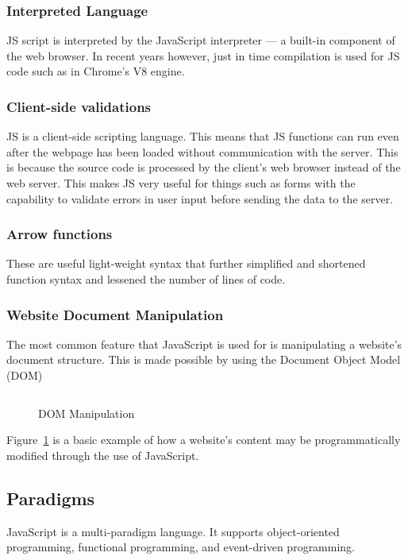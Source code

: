 \documentclass{article}
\newcommand{\js}[1]{\inputminted{javascript}{samples/js/#1.js}}
\begin{document}
    \subsubsection{Interpreted Language}
    JS script is interpreted by the JavaScript interpreter --- a built-in
    component of the web browser. In recent years however, just in time
    compilation is used for JS code such as in Chrome’s V8 engine.

    \subsubsection{Client-side validations}
    JS is a client-side scripting language. This means that JS functions can run
    even after the webpage has been loaded without communication with the server.
    This is because the source code is processed by the client’s web browser instead of
    the web server. This makes JS very useful for things such as forms with the
    capability to validate errors in user input before sending the data to the
    server.

    \subsubsection{Arrow functions}
    These are useful light-weight syntax that further simplified and shortened function
    syntax and lessened the number of lines of code.

    \subsubsection{Website Document Manipulation}
    The most common feature that JavaScript is used for is manipulating a
    website's document structure. This is made possible by using the Document
    Object Model (DOM)

    \begin{figure}[ht]
      \js{dom-manipulation}
      \caption{DOM Manipulation}
      \label{fig:dom-manipulation}
    \end{figure}

    Figure~\ref{fig:dom-manipulation} is a basic example of how a website's content
    may be programmatically modified through the use of JavaScript.

  \subsection{Paradigms}
  JavaScript is a multi-paradigm language. It supports object-oriented
  programming, functional programming, and event-driven programming.
\end{document}
